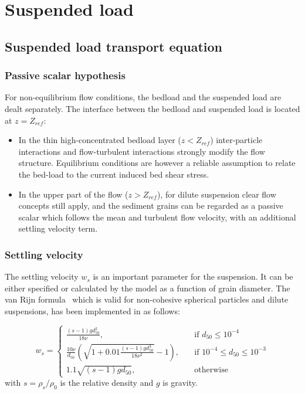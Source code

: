 \section{Suspended load}\label{ch:suspension}
\subsection{Suspended load transport equation}

\subsubsection{Passive scalar hypothesis}
For non-equilibrium flow conditions, the bedload and the suspended load
are dealt separately. The interface between the bedload and suspended
load is located at $z=Z_{ref}$:
\begin{itemize} 
\item In the thin high-concentrated bedload layer ($z <Z_{ref}$) inter-particle interactions and flow-turbulent interactions strongly modify the flow structure. Equilibrium conditions are however a
reliable assumption to relate the bed-load to the current induced bed shear
stress.
\item In the upper part of the flow ($z>Z_{ref}$), for dilute suspension clear flow concepts still apply, and the sediment grains can be regarded as a passive scalar which follows the mean and turbulent flow
velocity, with an additional settling velocity term.
\end{itemize}

\subsubsection{Settling velocity}
The settling velocity $w_{s}$ is an important parameter for the suspension.
It can be either specified or calculated by the model as a
function of grain diameter. The van Rijn formula~\cite{vanRijn87, vanRijn93} which is valid for non-cohesive spherical particles and dilute
suspensions, has been implemented in \sisyphe as follows:

\begin{equation*}
w_{s} = \left\{\begin{array}{ll}
\displaystyle
\frac{(s-1)g d_{50}^2}{18\nu}, & \quad \text{if } d_{50} \leq 10^{-4} \\
\displaystyle
\frac{10\nu}{d_{50}} \left(\sqrt{1+0.01\frac{(s-1)gd_{50}^3}{18\nu^2}}-1\right), & \quad \text{if } 10^{-4} \leq d_{50} \leq 10^{-3}\\ 
\displaystyle
1.1 \sqrt{(s-1)gd_{50}}, & \quad \text{otherwise} 
\end{array}
\right.
\end{equation*}
with $s=\rho_{s}/\rho_0$ is the relative density and $g$ is gravity.%

